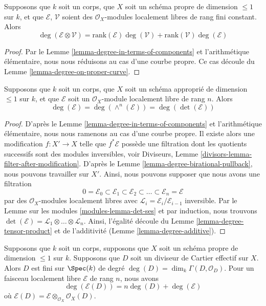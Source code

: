 \begin{lemma}
\label{lemma-degree-tensor-product}
Supposons que $k$ soit un corps, que $X$ soit un schéma propre de
dimension $\leq 1$ sur $k$, et que $\mathcal{E}$, $\mathcal{V}$ soient
des $\mathcal{O}_X$-modules localement libres de rang fini constant. Alors
$$
\deg(\mathcal{E} \otimes \mathcal{V}) =
\text{rank}(\mathcal{E}) \deg(\mathcal{V}) +
\text{rank}(\mathcal{V}) \deg(\mathcal{E})
$$
\end{lemma}

\begin{proof}
Par le Lemme \ref{lemma-degree-in-terms-of-components} et
l'arithmétique élémentaire, nous nous réduisons au cas d'une courbe
propre. Ce cas découle du Lemme \ref{lemma-degree-on-proper-curve}.
\end{proof}

\begin{lemma}
\label{lemma-degree-and-det}
Supposons que $k$ soit un corps, que $X$ soit un schéma
approprié de dimension $\leq 1$ sur $k$, et que $\mathcal{E}$
soit un $\mathcal{O}_X$-module localement libre de rang $n$. Alors
$$
\deg(\mathcal{E}) = \deg(\wedge^n(\mathcal{E})) = \deg(\det(\mathcal{E}))
$$
\end{lemma}

\begin{proof}
D'après le Lemme \ref{lemma-degree-in-terms-of-components} et
l'arithmétique élémentaire, nous nous ramenons au cas d'une
courbe propre. Il existe alors une modification $f : X' \to X$
telle que $f^*\mathcal{E}$ possède une filtration dont les
quotients successifs sont des modules inversibles, voir Diviseurs,
Lemme \ref{divisors-lemma-filter-after-modification}. D'après le
Lemme \ref{lemma-degree-birational-pullback}, nous pouvons travailler
sur $X'$. Ainsi, nous pouvons supposer que nous avons une filtration
$$
0 = \mathcal{E}_0 \subset \mathcal{E}_1 \subset \mathcal{E}_2 \subset
\ldots \subset \mathcal{E}_n = \mathcal{E}
$$
par des $\mathcal{O}_X$-modules localement libres avec
$\mathcal{L}_i = \mathcal{E}_i/\mathcal{E}_{i - 1}$ inversible. Par le
Lemme sur les modules \ref{modules-lemma-det-ses} et par induction,
nous trouvons $\det(\mathcal{E}) = \mathcal{L}_1 \otimes \ldots
\otimes \mathcal{L}_n$. Ainsi, l'égalité découle du Lemme
\ref{lemma-degree-tensor-product} et de l'additivité (Lemme \ref{lemma-degree-additive}).
\end{proof}

\begin{lemma}
\label{lemma-degree-effective-Cartier-divisor}
Supposons que $k$ soit un corps, supposons que $X$ soit un schéma
propre de dimension $\leq 1$ sur $k$. Supposons que $D$ soit un
diviseur de Cartier effectif sur $X$. Alors $D$ est fini sur
$\Spec(k)$ de degré $\deg(D) = \dim_k \Gamma(D, \mathcal{O}_D)$.
Pour un faisceau localement libre $\mathcal{E}$ de rang $n$, nous avons
$$
\deg(\mathcal{E}(D)) = n\deg(D) + \deg(\mathcal{E})
$$
où $\mathcal{E}(D) = \mathcal{E} \otimes_{\mathcal{O}_X} \mathcal{O}_X(D)$.
\end{lemma}

